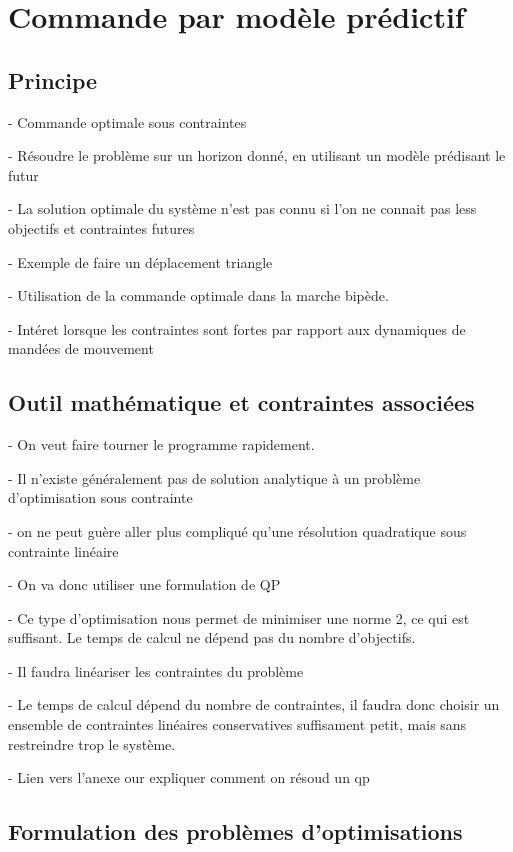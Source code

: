 \chapter{Commande par modèle prédictif}
\label{chapitre.commande}
	\section{Principe}

		- Commande optimale sous contraintes

		- Résoudre le problème sur un horizon donné, en utilisant un modèle prédisant le futur

		- La solution optimale du système n'est pas connu si l'on ne connait pas less objectifs et contraintes futures

		- Exemple de faire un déplacement triangle

		- Utilisation de la commande optimale dans la marche bipède.

		- Intéret lorsque les contraintes sont fortes par rapport aux dynamiques de mandées de mouvement

	\section{Outil mathématique et contraintes associées}

			- On veut faire tourner le programme rapidement.

			- Il n'existe généralement pas de solution analytique à un problème d'optimisation sous contrainte

			- on ne peut guère aller plus compliqué qu'une résolution quadratique sous contrainte linéaire

			- On va donc utiliser une formulation de QP

			- Ce type d'optimisation nous permet de minimiser une norme 2, ce qui est suffisant. Le temps de calcul ne dépend pas du nombre d'objectifs.

			- Il faudra linéariser les contraintes du problème

			- Le temps de calcul dépend du nombre de contraintes, il faudra donc choisir un ensemble de contraintes linéaires conservatives suffisament petit, mais sans restreindre trop le système.

			- Lien vers l'anexe our expliquer comment on résoud un qp

	\section{Formulation des problèmes d'optimisations}
